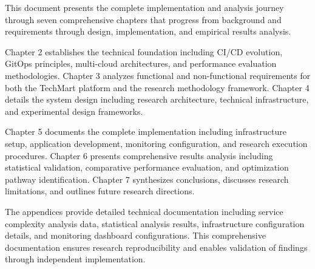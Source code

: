 This document presents the complete implementation and analysis journey through seven comprehensive chapters that progress from background and requirements through design, implementation, and empirical results analysis.

Chapter 2 establishes the technical foundation including CI/CD evolution, GitOps principles, multi-cloud architectures, and performance evaluation methodologies. Chapter 3 analyzes functional and non-functional requirements for both the TechMart platform and the research methodology framework. Chapter 4 details the system design including research architecture, technical infrastructure, and experimental design frameworks.

Chapter 5 documents the complete implementation including infrastructure setup, application development, monitoring configuration, and research execution procedures. Chapter 6 presents comprehensive results analysis including statistical validation, comparative performance evaluation, and optimization pathway identification. Chapter 7 synthesizes conclusions, discusses research limitations, and outlines future research directions.

The appendices provide detailed technical documentation including service complexity analysis data, statistical analysis results, infrastructure configuration details, and monitoring dashboard configurations. This comprehensive documentation ensures research reproducibility and enables validation of findings through independent implementation.